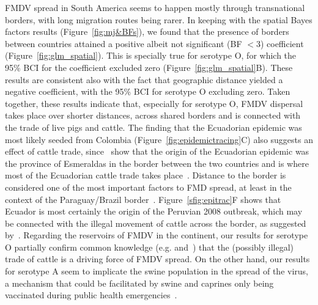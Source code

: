 \documentclass[10pt]{article}
\begin{document}
FMDV spread in South America seems to happen mostly through transnational borders, with long migration routes being rarer.
In keeping with the spatial Bayes factors results (Figure~\ref{fig:mj&BFs}), we found that the presence of borders between countries attained a positive albeit not significant (BF $<3$) coefficient (Figure~\ref{fig:glm_spatial}).
This is specially true for serotype O, for which the 95\% BCI for the coefficient excluded zero (Figure~\ref{fig:glm_spatial}B).
These results are consistent also with the fact that geographic distance yielded a negative coefficient, with the 95\% BCI for serotype O excluding zero.
Taken together, these results indicate that, especially for serotype O, FMDV dispersal takes place over shorter distances, across shared borders and is connected with the trade of live pigs and cattle.
The finding that the Ecuadorian epidemic was most likely seeded from Colombia (Figure~\ref{fig:epidemictracing}C) also suggests an effect of cattle trade, since~\citet{Carvalho2013} show that the origin of the Ecuadorian epidemic was the province of Esmeraldas in the border between the two countries and is where most of the Ecuadorian cattle trade takes place~\citep{Maradei2011}. %
Distance to the border is considered one of the most important factors to FMD spread, at least in the context of the Paraguay/Brazil border~\citep{Amaral2016}.
Figure~\ref{sfig:epitrac}F shows that Ecuador is most certainly the origin of the Peruvian 2008 outbreak, which may be connected with the illegal movement of cattle across the border, as suggested by~\citet{Correa2002}.
Regarding the reservoirs of FMDV in the continent, our results for serotype O partially confirm common knowledge (e.g.\citep{Saraiva2003} and~\citep{Naranjo2013}) that the (possibly illegal) trade of cattle is a driving force of FMDV spread.
On the other hand, our results for serotype A seem to implicate the swine population in the spread of the virus, a mechanism that could be facilitated by swine and caprines only being vaccinated during public health emergencies~\citep{Saraiva2003}.

\end{document}
